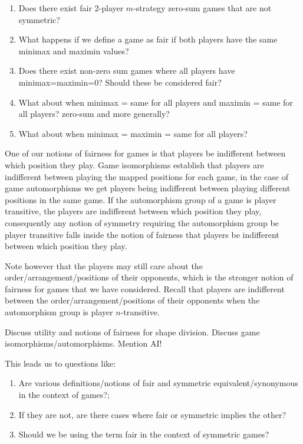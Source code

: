 
\begin{enumerate}
	\item Does there exist fair $2$-player $m$-strategy zero-sum games that are not symmetric?
	\item What happens if we define a game as fair if both players have the same minimax and maximin values? 
	\item Does there exist non-zero sum games where all players have minimax=maximin=0? Should these be considered fair?
	\item What about when minimax = same for all players and maximin = same for all players? zero-sum and more generally?
	\item What about when minimax = maximin = same for all players? 
\end{enumerate}

One of our notions of fairness for games is that players be indifferent between which position they play. Game isomorphisms establish that players are indifferent between playing the mapped positions for each game, in the case of game automorphisms we get players being indifferent between playing different positions in the same game. If the automorphism group of a game is player transitive, the players are indifferent between which position they play, consequently any notion of symmetry requiring the automorphism group be player transitive falls inside the notion of fairness that players be indifferent between which position they play. 

Note however that the players may still care about the order/arrangement/positions of their opponents, which is the stronger notion of fairness for games that we have considered. Recall that players are indifferent between the order/arrangement/positions of their opponents when the automorphism group is player $n$-transitive.  

Discuss utility and notions of fairness for shape division.
Discuss game isomorphisms/automorphisms. 
Mention AI! 

This leads us to questions like:
\begin{enumerate}
	\item Are various definitions/notions of fair and symmetric equivalent/synonymous in the context of games?;
	\item If they are not, are there cases where fair or symmetric implies the other?
	\item Should we be using the term fair in the context of symmetric games? 
\end{enumerate}

